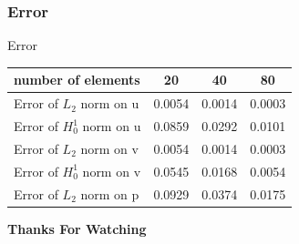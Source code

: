 \documentclass[11pt]{beamer}
\numberwithin{equation}{section}
\theoremstyle{plain}
\theoremstyle{definition}
\theoremstyle{remark}
\begin{document}
\begin{frame}\frametitle{Error}
\begin{block}{Error}
\begin{tabular}{|l||c||c||c|}
\hline 
number of elements  & 20 & 40 & 80  \\ 
\hline 
Error of $L_2$ norm on u  & 0.0054  &0.0014 & 0.0003  \\
\hline
Error of $H_0^1$ norm on u  & 0.0859 & 0.0292 & 0.0101  \\
\hline
Error of $L_2$ norm on v  & 0.0054  &0.0014 & 0.0003  \\
\hline
Error of $H_0^1$ norm on v  & 0.0545 & 0.0168 & 0.0054  \\
\hline
Error of $L_2$ norm on p  & 0.0929  &0.0374 & 0.0175  \\
\hline
\end{tabular}
\end{block}
\end{frame}
\begin{frame}
\begin{center}
\huge{ \textbf{Thanks For Watching}}
\end{center}
 \end{frame}
\end{document}
